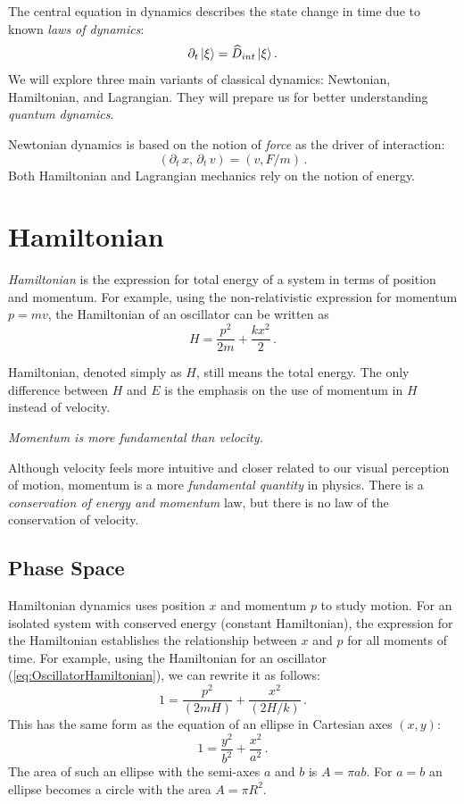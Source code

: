 The central equation in dynamics describes the state change in time due to known \emph{laws of dynamics}:
\[
\partial_t\,|{\xi}\rangle=\widehat{D}_{int}\,|{\xi}\rangle\,.
\]
We will explore three main variants of classical dynamics: Newtonian, Hamiltonian, and Lagrangian. They will prepare us for better understanding \emph{quantum dynamics}.

Newtonian dynamics is based on the notion of \emph{force} as the driver of interaction:
\[
(\partial_t\,x,\,\partial_t\, v)=(v, F/m)\,.
\]
Both Hamiltonian and Lagrangian mechanics rely on the notion of energy. 

\section{Hamiltonian}\label{sec:Hamiltonian}
\emph{Hamiltonian} is the expression for total energy of a system in terms of position and momentum. For example, using the non-relativistic expression for momentum $p=mv$, the Hamiltonian of  an oscillator can be written as
\begin{equation}
	H = \frac{p^2}{2m} + \frac{kx^2}{2}\,.
	\label{eq:OscillatorHamiltonian}
\end{equation}

Hamiltonian, denoted simply as $H$, still means the total energy. The only difference between $H$ and $E$  is the emphasis on the use of momentum in $H$ instead of velocity.

{\it Momentum is more fundamental than velocity.}

Although velocity feels more intuitive and closer related to our visual perception of motion, momentum is a more \emph{fundamental quantity} in physics. There is a \emph{conservation of energy and momentum} law, but there is no law of the conservation of velocity.

\subsection{Phase Space}
Hamiltonian dynamics uses position $x$  and momentum $p$  to study motion. For an isolated system with conserved energy (constant Hamiltonian), the expression for the Hamiltonian establishes the relationship between $x$ and $p$  for all moments of time. For example, using the Hamiltonian for an oscillator (\ref{eq:OscillatorHamiltonian}), we can rewrite it as follows:
\begin{equation}
	1=\frac{p^2}{(2mH)}+\frac{x^2}{(2H/k)}\,.
	\label{eq:phaseSpaceEllipse}
\end{equation}
This has the same form as the equation of an ellipse in Cartesian axes $(x,y)$:
\[
1=\frac{y^2}{b^2}+\frac{x^2}{a^2}\,.
\]
The area of such an ellipse with the semi-axes $a$ and $b$ is $A=\pi ab$. For $a=b$ an ellipse becomes a circle with the area $A=\pi R^2$.

